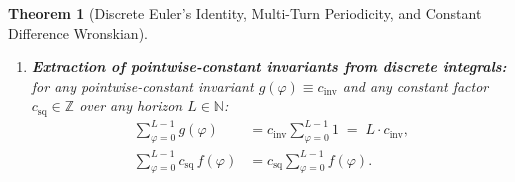 \documentclass[11pt,a4paper]{article}
\theoremstyle{plain}
\newtheorem{theorem}{Theorem}[section]
\theoremstyle{definition}
\begin{document}
\begin{theorem}[Discrete Euler's Identity, Multi-Turn Periodicity, and Constant Difference Wronskian]
\begin{enumerate}[label=\textbf{(\roman*)},leftmargin=*]
\begin{equation}
    \label{eq:constant-wronskian-all-512}
    \mathcal{W}_Q(\varphi) \;=\; (Q - m)(m + 1) - m(Q - m - 1) \;\equiv\; Q
    \qquad (\forall Q, m \in \mathbb{Z}).
  \end{equation}
\item \textbf{Extraction of pointwise-constant invariants from discrete integrals:}
  for any pointwise-constant invariant $g(\varphi) \equiv c_{\mathrm{inv}}$ and any constant factor $c_{\mathrm{sq}} \in \mathbb{Z}$ over any horizon $L \in \mathbb{N}$:
  \begin{align}
    \sum_{\varphi=0}^{L-1} g(\varphi) &= c_{\mathrm{inv}}\sum_{\varphi=0}^{L-1} 1 \;=\; L\cdot c_{\mathrm{inv}}, \label{eq:constant-extraction} \\
    \sum_{\varphi=0}^{L-1} c_{\mathrm{sq}}\,f(\varphi) &= c_{\mathrm{sq}}\sum_{\varphi=0}^{L-1} f(\varphi). \label{eq:linear-factor-extraction}
  \end{align}
\end{enumerate}
\end{theorem}
\end{document}
